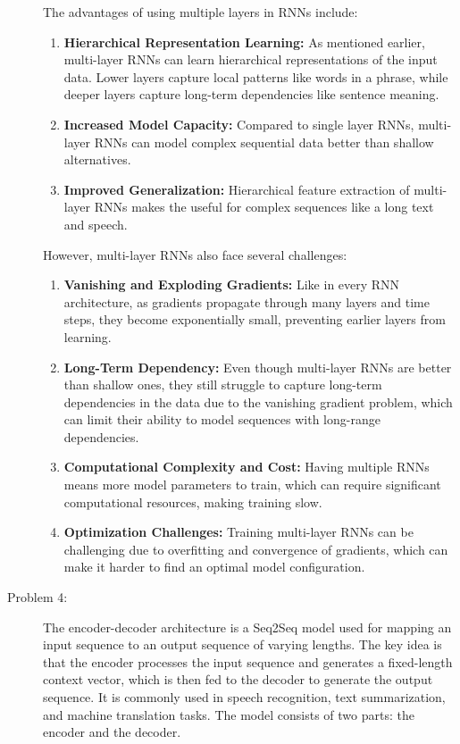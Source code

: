\documentclass[10pt]{article}
\begin{document}
\begin{description}
The advantages of using multiple layers in RNNs include:

\begin{enumerate}
    \item \textbf{Hierarchical Representation Learning:} As mentioned earlier, multi-layer RNNs can learn hierarchical representations of the input data.
    Lower layers capture local patterns like words in a phrase, while deeper layers capture long-term dependencies like sentence meaning.
    \item \textbf{Increased Model Capacity:} Compared to single layer RNNs, multi-layer RNNs can model complex sequential data better than shallow alternatives.
    \item \textbf{Improved Generalization:} Hierarchical feature extraction of multi-layer RNNs makes the useful for complex sequences like a long text and speech.
\end{enumerate}

However, multi-layer RNNs also face several challenges:

\begin{enumerate}
    \item \textbf{Vanishing and Exploding Gradients:} Like in every RNN architecture, as gradients propagate through many layers and time steps, 
    they become exponentially small, preventing earlier layers from learning.
    \item \textbf{Long-Term Dependency:} Even though multi-layer RNNs are better than shallow ones, they still struggle to capture long-term dependencies in the data due to 
    the vanishing gradient problem, which can limit their ability to model sequences with long-range dependencies.
    \item \textbf{Computational Complexity and Cost:} Having multiple RNNs means more model parameters to train, which can require significant computational resources, 
    making training slow.
    \item \textbf{Optimization Challenges:} Training multi-layer RNNs can be challenging due to overfitting and convergence of gradients, which can make it harder to 
    find an optimal model configuration.
\end{enumerate}

\pagebreak

\item[Problem 4:] \hfill %

The encoder-decoder architecture is a Seq2Seq model used for mapping an input sequence to an output sequence of varying lengths.
The key idea is that the encoder processes the input sequence and generates a fixed-length context vector, which is then fed to the decoder to generate the output sequence.
It is commonly used in speech recognition, text summarization, and machine translation tasks.
The model consists of two parts: the encoder and the decoder.


\end{description}
\end{document}
